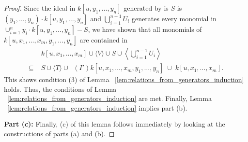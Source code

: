 \documentclass{amsart}
\theoremstyle{plain}
\theoremstyle{definition}
\theoremstyle{remark}
\numberwithin{equation}{section}
\DeclareMathOperator{\initial}{in_\prec}
\begin{document}
\begin{proof}
Since the ideal in $k[u, y_1,\ldots, y_n]$ generated by is $S$ is $(y_1, \ldots, y_n) \cdot k[u, y_1, \ldots, y_n]$ and $\bigcup_{i=1}^{n-1} U_i$ generates every monomial in $\cup_{i=1}^n y_i \cdot k[u, y_1, \ldots, y_n]-S$, we have shown that all monomials of $k[u, x_1, \ldots, x_m, y_1, \ldots, y_n]$ are contained in
\begin{align*}
				& k[u, x_1, \ldots, x_m] \cup \langle V \rangle \cup S \cup \left\langle \bigcup_{i=1}^{n-1} U_i \right\rangle \\
	\subseteq \; 	& S \cup \langle T\rangle \cup \initial(I') k[u, x_1, \ldots, x_m, y_1, \ldots, y_n] \; \cup \; k[u, x_1, \ldots, x_m].
\end{align*}
This shows condition (3) of Lemma ~\ref{lem:relations_from_generators_induction} holds.  Thus, the conditions of 
Lemma ~\ref{lem:relations_from_generators_induction} are met. Finally, Lemma ~\ref{lem:relations_from_generators_induction} implies part (b).  

{\bf Part (c):}
Finally, (c) of this lemma follows immediately by looking at the constructions of parts (a) and (b).  







\end{proof}
\end{document}
